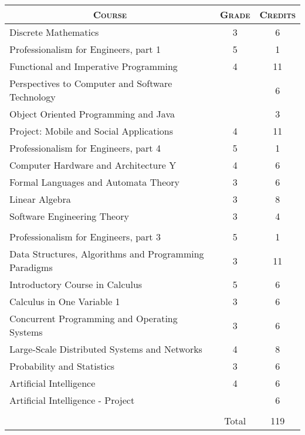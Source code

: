 \documentclass[a4paper,10pt]{article}
\begin{document}
\begin{center}
\begin{tabular}{lcc}
\multicolumn{1}{c}{\textsc{Course}}&\textsc{Grade}&\textsc{Credits}\\ \hline
Discrete Mathematics	&3&	6\\
Professionalism for Engineers, part 1	&5&	1\\
Functional and Imperative Programming	&4&	11\\
Perspectives to Computer and Software Technology	&&	6\\
Object Oriented Programming and Java && 3\\
Project: Mobile and Social Applications	&4&	11\\
Professionalism for Engineers, part 4	&5	&1\\
Computer Hardware and Architecture Y	&4&	6\\
Formal Languages and Automata Theory	&3&	6\\
Linear Algebra	&3&	8\\
Software Engineering Theory	&3&	4\\ \\
		
Professionalism for Engineers, part 3	&5&	1\\
Data Structures, Algorithms and Programming Paradigms	&3&	11\\
Introductory Course in Calculus	&5&	6\\
Calculus in One Variable 1	&3&	6\\

Concurrent Programming and Operating Systems	&3&	6\\
Large-Scale Distributed Systems and Networks	&4&	8\\
Probability and Statistics	&3&	6\\
Artificial Intelligence &4& 6\\
Artificial Intelligence - Project && 6\\


\\
		
		
    & Total&119\\\cline{2-3}
\end{tabular}
\end{center}
\end{document}
